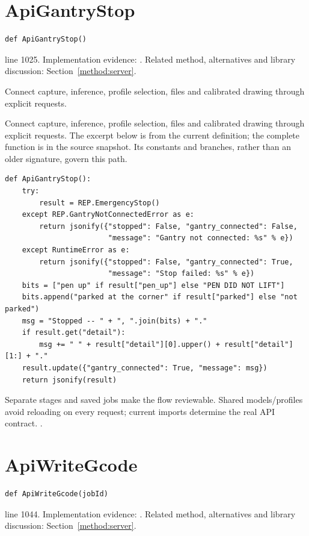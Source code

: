 \section{ApiGantryStop}\label{fn:web-server:ApiGantryStop}
\begin{lstlisting}[style=sig]
def ApiGantryStop()
\end{lstlisting}
 line 1025. Implementation evidence: \cite{code2026}. Related method, alternatives and library discussion: Section~\ref{method:server}.


Connect capture, inference, profile selection, files and calibrated drawing through explicit requests.


Connect capture, inference, profile selection, files and calibrated drawing through explicit requests. The excerpt below is from the current definition; the complete function is in the source snapshot. Its constants and branches, rather than an older signature, govern this path.


\begin{lstlisting}[style=plain]
def ApiGantryStop():
    try:
        result = REP.EmergencyStop()
    except REP.GantryNotConnectedError as e:
        return jsonify({"stopped": False, "gantry_connected": False,
                        "message": "Gantry not connected: %s" % e})
    except RuntimeError as e:
        return jsonify({"stopped": False, "gantry_connected": True,
                        "message": "Stop failed: %s" % e})
    bits = ["pen up" if result["pen_up"] else "PEN DID NOT LIFT"]
    bits.append("parked at the corner" if result["parked"] else "not parked")
    msg = "Stopped -- " + ", ".join(bits) + "."
    if result.get("detail"):
        msg += " " + result["detail"][0].upper() + result["detail"][1:] + "."
    result.update({"gantry_connected": True, "message": msg})
    return jsonify(result)
\end{lstlisting}
Separate stages and saved jobs make the flow reviewable. Shared models/profiles avoid reloading on every request; current imports determine the real API contract. \cite{flaskdocs,pillowops,code2026}.


\section{ApiWriteGcode}\label{fn:web-server:ApiWriteGcode}
\begin{lstlisting}[style=sig]
def ApiWriteGcode(jobId)
\end{lstlisting}
 line 1044. Implementation evidence: \cite{code2026}. Related method, alternatives and library discussion: Section~\ref{method:server}.


